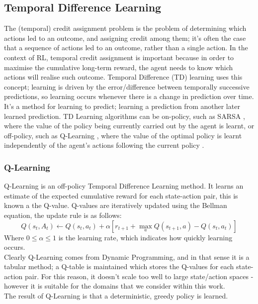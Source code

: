 \subsection{Temporal Difference Learning}
The (temporal) credit assignment problem \cite{Minsky:1961:ire} is the problem of determining which actions led to an outcome, and assigning credit among them; it's often the case that a sequence of actions led to an outcome, rather than a single action. In the context of RL, temporal credit assignment is important because in order to maximise the cumulative long-term reward, the agent needs to know which actions will realise such outcome. Temporal Difference (TD) \cite{10.5555/911176, 5392560, 5391906} learning uses this concept; learning is driven by the error/difference between temporally successive predictions, so learning occurs whenever there is a change in prediction over time. It's a method for learning to predict; learning a prediction from another later learned prediction.
TD Learning algorithms can be on-policy, such as SARSA \cite{rummery:cuedtr94}, where the value of the policy being currently carried out by the agent is learnt, or off-policy, such as Q-Learning \cite{Watkins:1989, journals/ml/WatkinsD92}, where the value of the optimal policy is learnt independently of the agent's actions following the current policy \cite{PooleMackworth17}.
\subsubsection{Q-Learning}
Q-Learning is an off-policy Temporal Difference Learning method. It learns an estimate of the expected cumulative reward for each state-action pair, this is known a the Q-value. Q-values are iteratively updated using the Bellman equation, the update rule is as follows:
$$Q(s_t,A_t) \leftarrow Q(s_t,a_t) + \alpha[r_{t+1} + \max_aQ(s_{t+1}, a) -Q(s_t,a_t)]$$
Where $0 \le \alpha \le 1$ is the learning rate, which indicates how quickly learning occurs.
\\Clearly Q-Learning comes from Dynamic Programming, and in that sense it is a tabular method; a Q-table is maintained which stores the Q-values for each state-action pair. For this reason, it doesn't scale too well to large state/action spaces - however it is suitable for the domains that we consider within this work.
\\The result of Q-Learning is that a deterministic, greedy policy is learned.

